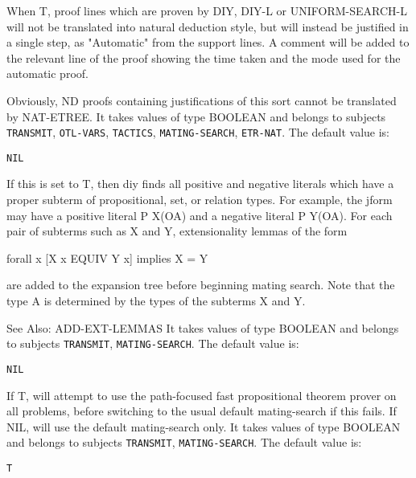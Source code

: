 \begin{description}
\item[USE-DIY]  
When T, proof lines which are proven by DIY, DIY-L or UNIFORM-SEARCH-L 
will not be translated into natural deduction style, but will instead be 
justified in a single step, as "Automatic" from the support lines. 
A comment will be added to the relevant line of the proof showing the
time taken and the mode used for the automatic proof.

Obviously, ND proofs containing justifications of this sort cannot be translated by
NAT-ETREE.
It takes values of type BOOLEAN and belongs to subjects \texttt{TRANSMIT}, \texttt{OTL-VARS}, \texttt{TACTICS}, \texttt{MATING-SEARCH}, \texttt{ETR-NAT}.  The default value is: \begin{lstlisting}
NIL
\end{lstlisting}

\item[USE-EXT-LEMMAS]  
If this is set to T, then diy finds all positive and
negative literals which have a proper subterm of propositional,
set, or relation types.  For example, the jform may have a positive
literal P X(OA) and a negative literal P Y(OA).  For each pair
of subterms such as X and Y, extensionality lemmas of the form

    forall x [X x EQUIV Y x] implies X = Y

are added to the expansion tree before beginning mating search.
Note that the type A is determined by the types of the
subterms X and Y.

See Also:  ADD-EXT-LEMMAS
It takes values of type BOOLEAN and belongs to subjects \texttt{TRANSMIT}, \texttt{MATING-SEARCH}.  The default value is: \begin{lstlisting}
NIL
\end{lstlisting}

\item[USE-FAST-PROP-SEARCH]  
If T, will attempt to use the path-focused fast propositional
theorem prover on all problems, before switching to the usual default
mating-search if this fails. If NIL, will use the default mating-search 
only.
It takes values of type BOOLEAN and belongs to subjects \texttt{TRANSMIT}, \texttt{MATING-SEARCH}.  The default value is: \begin{lstlisting}
T
\end{lstlisting}

\item
\end{description}

